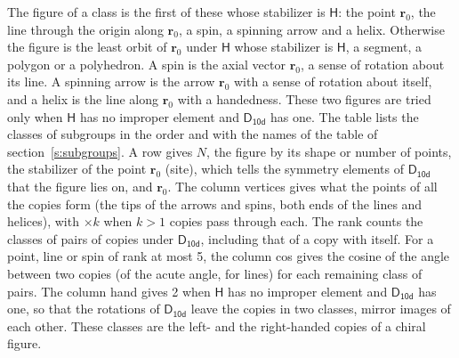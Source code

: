 \documentclass[10pt,a4paper]{article}
\numberwithin{equation}{section}
\newcommand{\grp}[1]{\mathsf{#1}}
\newcommand{\pointr}{\mathbf{r}}
\begin{document}
\leavevmode\label{n:head.figure}The figure of a class is the first of these whose stabilizer is $\grp{H}$: the point $\pointr_0$, the line through the origin along $\pointr_0$, a spin, a spinning arrow and a helix. Otherwise the figure is the least orbit of $\pointr_0$ under $\grp{H}$ whose stabilizer is $\grp{H}$, a segment, a polygon or a polyhedron. A spin is the axial vector $\pointr_0$, a sense of rotation about its line. A spinning arrow is the arrow $\pointr_0$ with a sense of rotation about itself, and a helix is the line along $\pointr_0$ with a handedness. These two figures are tried only when $\grp{H}$ has no improper element and $\grp{D_{10d}}$ has one. The table lists the classes of subgroups in the order and with the names of the table of section~\ref{s:subgroups}. \label{n:head.site}A row gives $N$, the figure by its shape or number of points, the stabilizer of the point $\pointr_0$ (site), which tells the symmetry elements of $\grp{D_{10d}}$ that the figure lies on, and $\pointr_0$. \label{n:head.vertices}The column vertices gives what the points of all the copies form (the tips of the arrows and spins, both ends of the lines and helices), with ${\times}k$ when $k > 1$ copies pass through each. \label{n:head.rank}The rank counts the classes of pairs of copies under $\grp{D_{10d}}$, including that of a copy with itself. \label{n:head.cos}For a point, line or spin of rank at most 5, the column cos gives the cosine of the angle between two copies (of the acute angle, for lines) for each remaining class of pairs. \label{n:head.hand}The column hand gives 2 when $\grp{H}$ has no improper element and $\grp{D_{10d}}$ has one, so that the rotations of $\grp{D_{10d}}$ leave the copies in two classes, mirror images of each other. These classes are the left- and the right-handed copies of a chiral figure.
\end{document}
